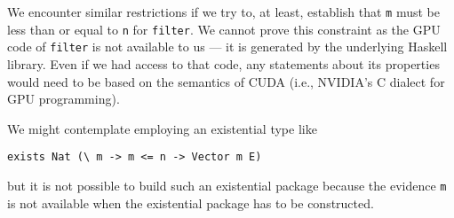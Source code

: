 \documentclass{llncs}
\begin{document}
We encounter similar restrictions if we try to, at least, establish that \texttt{m} must be less
than or equal to \texttt{n} for \texttt{filter}. We cannot prove this constraint as the GPU code of
\texttt{filter} is not available to us --- it is generated by the underlying Haskell library. Even
if we had access to that code, any statements about its properties would need to be based on the
semantics of CUDA (i.e., NVIDIA's C dialect for GPU programming).

We might contemplate employing an existential type like
\begin{verbatim}
exists Nat (\ m -> m <= n -> Vector m E)
\end{verbatim}
but it is not possible to build such an
existential package because the evidence \texttt{m} is not available
when the existential package has to be constructed.
\end{document}
